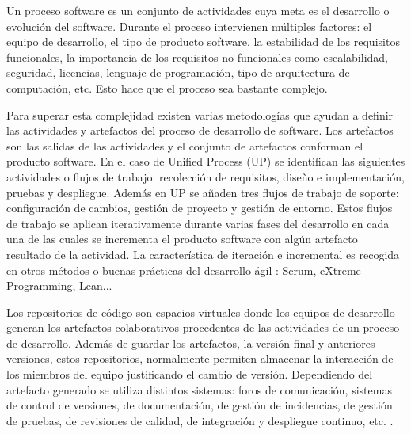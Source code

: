 

Un proceso software es un conjunto de actividades cuya meta es el desarrollo o evolución del software. Durante el proceso intervienen múltiples factores: el equipo de desarrollo, el tipo de producto software, la estabilidad de los requisitos funcionales, la importancia de los requisitos no funcionales como escalabilidad, seguridad, licencias, lenguaje de programación, tipo de arquitectura de computación, etc. Esto hace que el proceso sea bastante complejo.

Para superar esta complejidad existen varias metodologías que ayudan a definir las actividades y artefactos del proceso de desarrollo de software. Los artefactos son las salidas de las actividades y el conjunto de artefactos conforman el producto software. En el caso de  Unified Process (UP) \cite{jacobson_proceso_2000} se identifican las siguientes actividades o flujos de trabajo: recolección de requisitos, diseño e implementación, pruebas y despliegue. Además en UP se añaden tres flujos de trabajo de soporte: configuración de cambios, gestión de proyecto y gestión de entorno. Estos flujos de trabajo se aplican iterativamente durante varias fases del desarrollo en cada una de las cuales se incrementa el producto software con algún artefacto resultado de la actividad. La característica de iteración e incremental es recogida en otros métodos o buenas prácticas del desarrollo ágil \cite{noauthor_scrum_2019}: Scrum, eXtreme Programming, Lean...


Los repositorios de código son espacios virtuales donde los equipos de desarrollo generan los artefactos colaborativos procedentes de las actividades de un proceso de desarrollo. Además de guardar los artefactos, la versión final y anteriores versiones, estos repositorios, normalmente permiten almacenar la interacción de los miembros del equipo justificando el cambio de versión. Dependiendo del artefacto generado se utiliza distintos sistemas: foros de comunicación, sistemas de control de versiones, de documentación, de gestión de incidencias, de gestión de pruebas, de revisiones de calidad, de  integración y despliegue continuo, etc. \cite{guemes-pena_emerging_2018}.

